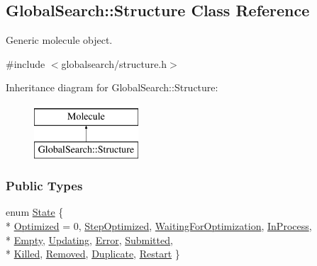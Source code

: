 \hypertarget{classGlobalSearch_1_1Structure}{}\subsection{Global\+Search\+:\+:Structure Class Reference}
\label{classGlobalSearch_1_1Structure}


Generic molecule object.  




{\ttfamily \#include $<$globalsearch/structure.\+h$>$}

Inheritance diagram for Global\+Search\+:\+:Structure\+:\begin{figure}[H]
\begin{center}
\leavevmode
\includegraphics[height=2.000000cm]{classGlobalSearch_1_1Structure}
\end{center}
\end{figure}
\subsubsection*{Public Types}
\begin{DoxyCompactItemize}
\item 
enum \hyperlink{classGlobalSearch_1_1Structure_a3f1e44cb4f603fe1b3fbc8e813535917}{State} \{ \\*
\hyperlink{classGlobalSearch_1_1Structure_a3f1e44cb4f603fe1b3fbc8e813535917a75ed0969285b99dc1e54c654428be5e0}{Optimized} = 0, 
\hyperlink{classGlobalSearch_1_1Structure_a3f1e44cb4f603fe1b3fbc8e813535917ae572101eab4010061be0073888fbee39}{Step\+Optimized}, 
\hyperlink{classGlobalSearch_1_1Structure_a3f1e44cb4f603fe1b3fbc8e813535917ad4d8f76770421b6ab8d39f60e280a0a0}{Waiting\+For\+Optimization}, 
\hyperlink{classGlobalSearch_1_1Structure_a3f1e44cb4f603fe1b3fbc8e813535917a4f451a4c3de6ed294e1c7d06e5b1d24c}{In\+Process}, 
\\*
\hyperlink{classGlobalSearch_1_1Structure_a3f1e44cb4f603fe1b3fbc8e813535917a1639a0fd1ec7f1bba6cdaf73a2e76582}{Empty}, 
\hyperlink{classGlobalSearch_1_1Structure_a3f1e44cb4f603fe1b3fbc8e813535917ae64ed17fe917f0b8fd679078b5b12447}{Updating}, 
\hyperlink{classGlobalSearch_1_1Structure_a3f1e44cb4f603fe1b3fbc8e813535917a6b33b578b7e228f289720292019a998a}{Error}, 
\hyperlink{classGlobalSearch_1_1Structure_a3f1e44cb4f603fe1b3fbc8e813535917a5a0e4ad5830e2c3a9b045da79098b6c7}{Submitted}, 
\\*
\hyperlink{classGlobalSearch_1_1Structure_a3f1e44cb4f603fe1b3fbc8e813535917acd16cf0031d5e5b522b61618fd73fdc1}{Killed}, 
\hyperlink{classGlobalSearch_1_1Structure_a3f1e44cb4f603fe1b3fbc8e813535917ac5686d195648a0800584c59d034e8be0}{Removed}, 
\hyperlink{classGlobalSearch_1_1Structure_a3f1e44cb4f603fe1b3fbc8e813535917a1cd89f1eb6cab53ae2bb1b2ad64dfe72}{Duplicate}, 
\hyperlink{classGlobalSearch_1_1Structure_a3f1e44cb4f603fe1b3fbc8e813535917a99c42cb7635428e83d759cdae79209ec}{Restart}
 \}
\end{DoxyCompactItemize}
